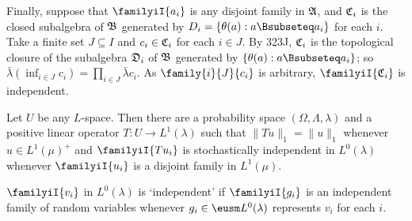 {Finally, suppose that $\familyiI{a_i}$ is any disjoint family in
$\frak A$, and $\frak C_i$ is the closed subalgebra of $\frak B$
generated by $D_i=\{\theta(a):a\Bsubseteq a_i\}$ for each $i$.   Take a
finite set $J\subseteq I$ and $c_i\in\frak C_i$ for each $i\in J$.   By
323J, $\frak C_i$ is the topological closure of the subalgebra
$\frak D_i$ of $\frak B$ generated by $\{\theta(a):a\Bsubseteq a_i\}$;
so $\bar\lambda(\inf_{i\in J}c_i)=\prod_{i\in J}\bar\lambda c_i$.   As
$\family{i}{J}{c_i}$ is arbitrary, $\familyiI{\frak C_i}$ is
independent.
}%

 Let $U$ be any $L$-space.
Then there are a probability space $(\Omega,\Lambda,\lambda)$ and a
positive linear operator $T:U\to L^1(\lambda)$ such that
$\|Tu\|_1=\|u\|_1$ whenever $u\in L^1(\mu)^+$ and $\familyiI{Tu_i}$ is
stochastically independent in $L^0(\lambda)$ whenever $\familyiI{u_i}$
is a disjoint family in $L^1(\mu)$.

\medskip

    $\familyiI{v_i}$ in
$L^0(\lambda)$ is `independent' if $\familyiI{g_i}$ is an independent
family of random variables whenever $g_i\in\eusm L^0(\lambda)$
represents $v_i$ for each $i$.

